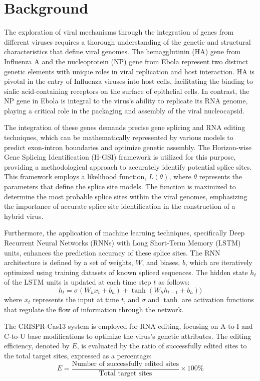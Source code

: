 \documentclass{article}
\begin{document}
\section{Background}
The exploration of viral mechanisms through the integration of genes from different viruses requires a thorough understanding of the genetic and structural characteristics that define viral genomes. The hemagglutinin (HA) gene from Influenza A and the nucleoprotein (NP) gene from Ebola represent two distinct genetic elements with unique roles in viral replication and host interaction. HA is pivotal in the entry of Influenza viruses into host cells, facilitating the binding to sialic acid-containing receptors on the surface of epithelial cells. In contrast, the NP gene in Ebola is integral to the virus's ability to replicate its RNA genome, playing a critical role in the packaging and assembly of the viral nucleocapsid.

The integration of these genes demands precise gene splicing and RNA editing techniques, which can be mathematically represented by various models to predict exon-intron boundaries and optimize genetic assembly. The Horizon-wise Gene Splicing Identification (H-GSI) framework is utilized for this purpose, providing a methodological approach to accurately identify potential splice sites. This framework employs a likelihood function, \( L(\theta) \), where \( \theta \) represents the parameters that define the splice site models. The function is maximized to determine the most probable splice sites within the viral genomes, emphasizing the importance of accurate splice site identification in the construction of a hybrid virus.

Furthermore, the application of machine learning techniques, specifically Deep Recurrent Neural Networks (RNNs) with Long Short-Term Memory (LSTM) units, enhances the prediction accuracy of these splice sites. The RNN architecture is defined by a set of weights, \( W \), and biases, \( b \), which are iteratively optimized using training datasets of known spliced sequences. The hidden state \( h_t \) of the LSTM units is updated at each time step \( t \) as follows: 
\[ h_t = \sigma(W_h x_t + b_h) + \tanh(W_h h_{t-1} + b_h)) \]
where \( x_t \) represents the input at time \( t \), and \( \sigma \) and \( \tanh \) are activation functions that regulate the flow of information through the network.

The CRISPR-Cas13 system is employed for RNA editing, focusing on A-to-I and C-to-U base modifications to optimize the virus's genetic attributes. The editing efficiency, denoted by \( E \), is evaluated by the ratio of successfully edited sites to the total target sites, expressed as a percentage:
\[ E = \frac{\text{Number of successfully edited sites}}{\text{Total target sites}} \times 100\% \]
\end{document}
